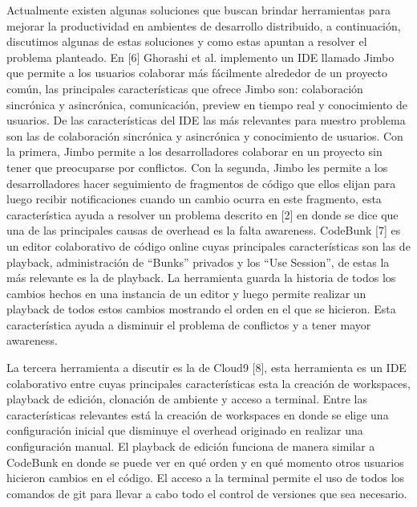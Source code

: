 Actualmente existen algunas soluciones que buscan brindar herramientas para mejorar la productividad en ambientes de desarrollo distribuido, a continuación, discutimos algunas de estas soluciones y como estas apuntan a resolver el problema planteado. En [6] Ghorashi et al. implemento un IDE llamado Jimbo que permite a los usuarios colaborar más fácilmente alrededor de un proyecto común, las principales características que ofrece Jimbo son: colaboración sincrónica y asincrónica, comunicación, preview en tiempo real y conocimiento de usuarios. De las características del IDE las más relevantes para nuestro problema son las de colaboración sincrónica y asincrónica y conocimiento de usuarios. Con la primera, Jimbo permite a los desarrolladores colaborar en un proyecto sin tener que preocuparse por conflictos. Con la segunda, Jimbo les permite a los desarrolladores hacer seguimiento de fragmentos de código que ellos elijan para luego recibir notificaciones cuando un cambio ocurra en este fragmento, esta característica ayuda a resolver un problema descrito en [2] en donde se dice que una de las principales causas de overhead es la falta awareness. CodeBunk [7] es un editor colaborativo de código online cuyas principales características son las de playback, administración de “Bunks” privados y los “Use Session”, de estas la más relevante es la de playback. La herramienta guarda la historia de todos los cambios hechos en una instancia de un editor y luego permite realizar un playback de todos estos cambios mostrando el orden en el que se hicieron. Esta característica ayuda a disminuir el problema de conflictos y a tener mayor awareness. 

La tercera herramienta a discutir es la de Cloud9 [8], esta herramienta es un IDE colaborativo entre cuyas principales características esta la creación de workspaces, playback de edición, clonación de ambiente y acceso a terminal. Entre las características relevantes está la creación de workspaces en donde se elige una configuración inicial que disminuye el overhead originado en realizar una configuración manual. El playback de edición funciona de manera similar a CodeBunk en donde se puede ver en qué orden y en qué momento otros usuarios hicieron cambios en el código. El acceso a la terminal permite el uso de todos los comandos de git para llevar a cabo todo el control de versiones que sea necesario.
